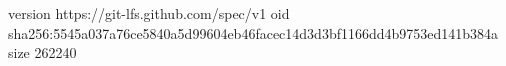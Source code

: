 version https://git-lfs.github.com/spec/v1
oid sha256:5545a037a76ce5840a5d99604eb46facec14d3d3bf1166dd4b9753ed141b384a
size 262240

